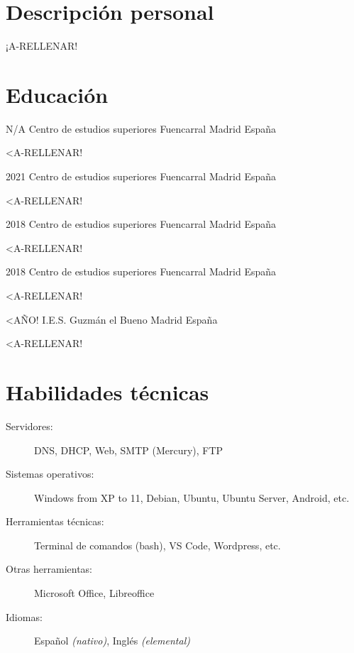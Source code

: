 \documentclass[10pt]{CurriculumVitae}
\begin{document}
  \makeheading


  \section{Descripción personal}
    {
      ¡A-RELLENAR!
    }


  \section{Educación}

      {N/A}
      {Centro de estudios superiores Fuencarral}
      {Madrid}
      {España}
      {
        \item <A-RELLENAR!
      }

      {2021}
      {Centro de estudios superiores Fuencarral}
      {Madrid}
      {España}
      {
        \item <A-RELLENAR!
      }

      {2018}
      {Centro de estudios superiores Fuencarral}
      {Madrid}
      {España}
      {
        \item <A-RELLENAR!
      }

      {2018}
      {Centro de estudios superiores Fuencarral}
      {Madrid}
      {España}
      {
        \item <A-RELLENAR!
      }

      {<AÑO!}
      {I.E.S. Guzmán el Bueno}
      {Madrid}
      {España}
      {
        \item <A-RELLENAR!
      }


  \section{Habilidades técnicas}
    
    \begin{description}
      \item[Servidores:] DNS, DHCP, Web, SMTP (Mercury), FTP
      \item[Sistemas operativos:] Windows from XP to 11, Debian, Ubuntu, Ubuntu Server, Android, etc.
      \item[Herramientas técnicas:] Terminal de comandos (bash), VS Code, Wordpress, etc.
      \item[Otras herramientas:] Microsoft Office, Libreoffice
      \item[Idiomas:] Español \emph{(nativo)}, Inglés \emph{(elemental)}
    \end{description}
\end{document}
